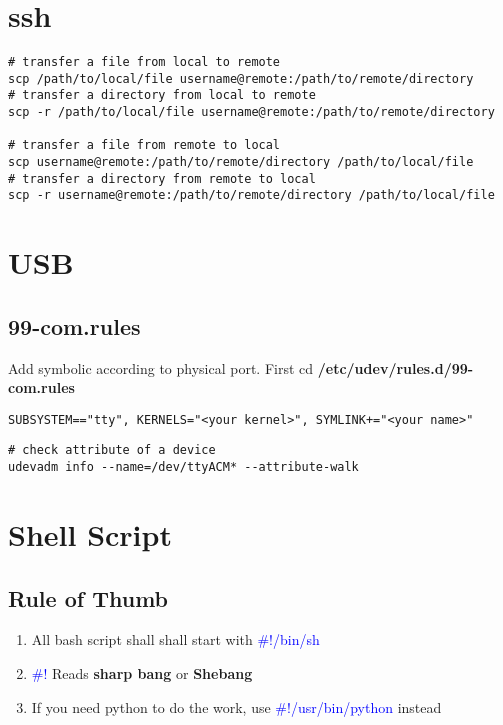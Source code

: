 \documentclass[12pt,a4paper]{article}
\newcommand{\bt}[1]{\textcolor{blue}{#1}}
\begin{document}
\section{ssh}
\begin{footnotesize}
\begin{verbatim}
# transfer a file from local to remote
scp /path/to/local/file username@remote:/path/to/remote/directory
# transfer a directory from local to remote
scp -r /path/to/local/file username@remote:/path/to/remote/directory

# transfer a file from remote to local
scp username@remote:/path/to/remote/directory /path/to/local/file 
# transfer a directory from remote to local
scp -r username@remote:/path/to/remote/directory /path/to/local/file 
\end{verbatim}
\end{footnotesize}

\section{USB}

\subsection{99-com.rules}
Add symbolic according to physical port. First cd \textbf{/etc/udev/rules.d/99-com.rules}
\begin{footnotesize}
\begin{verbatim}
SUBSYSTEM=="tty", KERNELS="<your kernel>", SYMLINK+="<your name>"
\end{verbatim}
\end{footnotesize}

\begin{footnotesize}
\begin{verbatim}
# check attribute of a device
udevadm info --name=/dev/ttyACM* --attribute-walk
\end{verbatim}
\end{footnotesize}

\section{Shell Script}
\subsection{Rule of Thumb}
\begin{enumerate}
	\item All bash script shall shall start with \bt{\#!/bin/sh}
	\item \bt{\#!} Reads \textbf{sharp bang} or \textbf{Shebang}
	\item If you need python to do the work, use \bt{\#!/usr/bin/python} instead
\end{enumerate}
\end{document}

